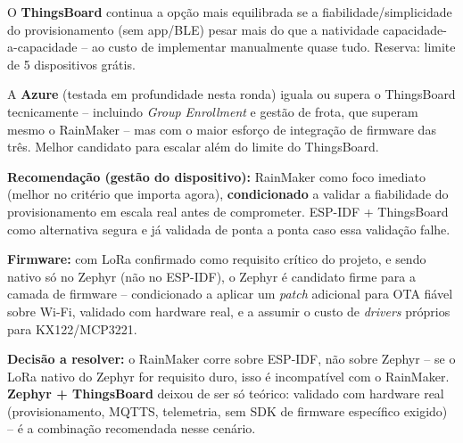 \documentclass[a4paper,11pt]{article}
\begin{document}
O \textbf{ThingsBoard} continua a opção mais equilibrada se a fiabilidade/simplicidade do provisionamento (sem app/BLE) pesar mais do que a natividade capacidade-a-capacidade -- ao custo de implementar manualmente quase tudo. Reserva: limite de 5 dispositivos grátis.

A \textbf{Azure} (testada em profundidade nesta ronda) iguala ou supera o ThingsBoard tecnicamente -- incluindo \textit{Group Enrollment} e gestão de frota, que superam mesmo o RainMaker -- mas com o maior esforço de integração de firmware das três. Melhor candidato para escalar além do limite do ThingsBoard.

\textbf{Recomendação (gestão do dispositivo):} RainMaker como foco imediato (melhor no critério que importa agora), \textbf{condicionado} a validar a fiabilidade do provisionamento em escala real antes de comprometer. ESP-IDF + ThingsBoard como alternativa segura e já validada de ponta a ponta caso essa validação falhe.

\textbf{Firmware:} com LoRa confirmado como requisito crítico do projeto, e sendo nativo só no Zephyr (não no ESP-IDF), o Zephyr é candidato firme para a camada de firmware -- condicionado a aplicar um \textit{patch} adicional para OTA fiável sobre Wi-Fi, validado com hardware real, e a assumir o custo de \textit{drivers} próprios para KX122/MCP3221.

\textbf{Decisão a resolver:} o RainMaker corre sobre ESP-IDF, não sobre Zephyr -- se o LoRa nativo do Zephyr for requisito duro, isso é incompatível com o RainMaker. \textbf{Zephyr + ThingsBoard} deixou de ser só teórico: validado com hardware real (provisionamento, MQTTS, telemetria, sem SDK de firmware específico exigido) -- é a combinação recomendada nesse cenário.
\end{document}
